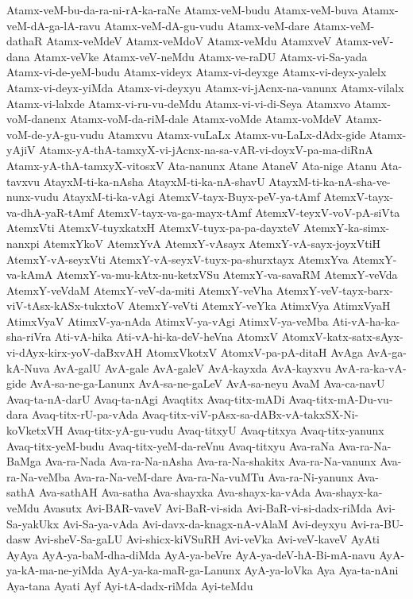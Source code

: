 {Atamx-veM-bu-da-ra-ni-rA-ka-raNe
Atamx-veM-budu
Atamx-veM-buva
Atamx-veM-dA-ga-lA-ravu
Atamx-veM-dA-gu-vudu
Atamx-veM-dare
Atamx-veM-dathaR
Atamx-veMdeV
Atamx-veMdoV
Atamx-veMdu
AtamxveV
Atamx-veV-dana
Atamx-veVke
Atamx-veV-neMdu
Atamx-ve-raDU
Atamx-vi-Sa-yada
Atamx-vi-de-yeM-budu
Atamx-videyx
Atamx-vi-deyxge
Atamx-vi-deyx-yalelx
Atamx-vi-deyx-yiMda
Atamx-vi-deyxyu
Atamx-vi-jAcnx-na-vanunx
Atamx-vilalx
Atamx-vi-lalxde
Atamx-vi-ru-vu-deMdu
Atamx-vi-vi-di-Seya
Atamxvo
Atamx-voM-danenx
Atamx-voM-da-riM-dale
Atamx-voMde
Atamx-voMdeV
Atamx-voM-de-yA-gu-vudu
Atamxvu
Atamx-vuLaLx
Atamx-vu-LaLx-dAdx-gide
Atamx-yAjiV
Atamx-yA-thA-tamxyX-vi-jAcnx-na-sa-vAR-vi-doyxV-pa-ma-diRnA
Atamx-yA-thA-tamxyX-vitosxV
Ata-nanunx
Atane
AtaneV
Ata-nige
Atanu
Ata-tavxvu
AtayxM-ti-ka-nAsha
AtayxM-ti-ka-nA-shavU
AtayxM-ti-ka-nA-sha-ve-nunx-vudu
AtayxM-ti-ka-vAgi
AtemxV-tayx-Buyx-peV-ya-tAmf
AtemxV-tayx-va-dhA-yaR-tAmf
AtemxV-tayx-va-ga-mayx-tAmf
AtemxV-teyxV-voV-pA-siVta
AtemxVti
AtemxV-tuyxkatxH
AtemxV-tuyx-pa-pa-dayxteV
AtemxY-ka-simx-nanxpi
AtemxYkoV
AtemxYvA
AtemxY-vAsayx
AtemxY-vA-sayx-joyxVtiH
AtemxY-vA-seyxVti
AtemxY-vA-seyxV-tuyx-pa-shurxtayx
AtemxYva
AtemxY-va-kAmA
AtemxY-va-mu-kAtx-nu-ketxVSu
AtemxY-va-savaRM
AtemxY-veVda
AtemxY-veVdaM
AtemxY-veV-da-miti
AtemxY-veVha
AtemxY-veV-tayx-barx-viV-tAsx-kASx-tukxtoV
AtemxY-veVti
AtemxY-veYka
AtimxVya
AtimxVyaH
AtimxVyaV
AtimxV-ya-nAda
AtimxV-ya-vAgi
AtimxV-ya-veMba
Ati-vA-ha-ka-sha-riVra
Ati-vA-hika
Ati-vA-hi-ka-deV-heVna
AtomxV
AtomxV-katx-satx-sAyx-vi-dAyx-kirx-yoV-daBxvAH
AtomxVkotxV
AtomxV-pa-pA-ditaH
AvAga
AvA-ga-kA-Nuva
AvA-galU
AvA-gale
AvA-galeV
AvA-kayxda
AvA-kayxvu
AvA-ra-ka-vA-gide
AvA-sa-ne-ga-Lanunx
AvA-sa-ne-gaLeV
AvA-sa-neyu
AvaM
Ava-ca-navU
Avaq-ta-nA-darU
Avaq-ta-nAgi
Avaqtitx
Avaq-titx-mADi
Avaq-titx-mA-Du-vu-dara
Avaq-titx-rU-pa-vAda
Avaq-titx-viV-pAsx-sa-dABx-vA-takxSX-Ni-koVketxVH
Avaq-titx-yA-gu-vudu
Avaq-titxyU
Avaq-titxya
Avaq-titx-yanunx
Avaq-titx-yeM-budu
Avaq-titx-yeM-da-reVnu
Avaq-titxyu
Ava-raNa
Ava-ra-Na-BaMga
Ava-ra-Nada
Ava-ra-Na-nAsha
Ava-ra-Na-shakitx
Ava-ra-Na-vanunx
Ava-ra-Na-veMba
Ava-ra-Na-veM-dare
Ava-ra-Na-vuMTu
Ava-ra-Ni-yanunx
Ava-sathA
Ava-sathAH
Ava-satha
Ava-shayxka
Ava-shayx-ka-vAda
Ava-shayx-ka-veMdu
Avasutx
Avi-BAR-vaveV
Avi-BaR-vi-sida
Avi-BaR-vi-si-dadx-riMda
Avi-Sa-yakUkx
Avi-Sa-ya-vAda
Avi-davx-da-knagx-nA-vAlaM
Avi-deyxyu
Avi-ra-BU-dasw
Avi-sheV-Sa-gaLU
Avi-shicx-kiVSuRH
Avi-veVka
Avi-veV-kaveV
AyAti
AyAya
AyA-ya-baM-dha-diMda
AyA-ya-beVre
AyA-ya-deV-hA-Bi-mA-navu
AyA-ya-kA-ma-ne-yiMda
AyA-ya-ka-maR-ga-Lanunx
AyA-ya-loVka
Aya
Aya-ta-nAni
Aya-tana
Ayati
Ayf
Ayi-tA-dadx-riMda
Ayi-teMdu
}

